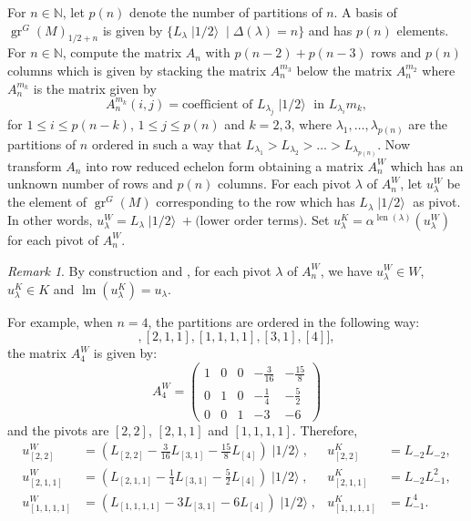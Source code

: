 \documentclass[a4paper, 12pt, reqno]{amsart}
\theoremstyle{remark}
\newtheorem{remark}[theorem]{Remark}
\numberwithin{equation}{subsection}
\DeclareMathOperator{\gr}{gr}
\DeclareMathOperator{\lm}{lm}
\DeclareMathOperator{\len}{len}
\DeclareMathOperator{\vachalf}{|1/2\rangle}
\begin{document}
For $n \in \mathbb{N}$, let $p(n)$ denote the number of partitions of $n$.
A basis of $\gr^G(M)_{1/2 + n}$ is given by $\{L_\lambda\vachalf \mid \Delta(\lambda) = n\}$ and has $p(n)$ elements. 
For $n \in \mathbb{N}$, compute the matrix $A_n$ with $p(n - 2) + p(n - 3)$ rows and $p(n)$ columns which is given by stacking the matrix $A^{m_3}_n$ below the matrix $A^{m_2}_n$ where $A^{m_k}_n$ is the matrix given by
\begin{equation*}
  A^{m_k}_n(i, j) = \text{coefficient of }L_{\lambda_j}\vachalf\text{ in }L_{\lambda_i}m_k,
\end{equation*}
for $1 \le i \le p(n - k)$, $1 \le j \le p(n)$ and $k = 2, 3$, where $\lambda_1, \dots, \lambda_{p(n)}$ are the partitions of $n$ ordered in such a way that $L_{\lambda_1} > L_{\lambda_2} > \dots > L_{\lambda_{p(n)}}$.
Now transform $A_n$ into row reduced echelon form obtaining a matrix $A^W_n$ which has an unknown number of rows and $p(n)$ columns.
For each pivot $\lambda$ of $A^W_n$, let $u^W_\lambda$ be the element of $\gr^G(M)$ corresponding to the row which has $L_\lambda\vachalf$ as pivot.
In other words, $u^W_\lambda = L_\lambda\vachalf + \text{(lower order terms)}$.
Set $u^K_\lambda = \alpha^{\len(\lambda)}(u^W_\lambda)$ for each pivot of $A^W_n$.

\begin{remark}
  \label{rmk:37}
  By construction and , for each pivot $\lambda$ of $A^W_n$, we have $u^W_\lambda \in W$, $u^K_\lambda \in K$ and $\lm(u^K_\lambda) = u_\lambda$.
\end{remark}

For example, when $n = 4$, the partitions are ordered in the following way:
  \begin{equation*}
    [[2, 2], [2, 1, 1], [1, 1, 1, 1], [3, 1], [4]],
  \end{equation*}
  the matrix $A^W_4$ is given by:
  \begin{equation*}
    A^W_4=
    \begin{pmatrix}
      1 & 0 & 0 & -\frac{3}{16} & -\frac{15}{8} \\
      0 & 1 & 0 & -\frac{1}{4} & -\frac{5}{2} \\
      0 & 0 & 1 & -3 & -6
    \end{pmatrix}
  \end{equation*}
  and the pivots are $[2, 2]$, $[2, 1, 1]$ and $[1, 1, 1, 1]$.
  Therefore,
  \begin{align*}
    u^W_{[2, 2]} &= (L_{[2, 2]} - \tfrac{3}{16}L_{[3, 1]} - \tfrac{15}{8}L_{[4]})\vachalf, &u^K_{[2, 2]} &= L_{-2}L_{-2}, \\
    u^W_{[2, 1, 1]} &= (L_{[2, 1, 1]} - \tfrac{1}{4}L_{[3, 1]} - \tfrac{5}{2}L_{[4]})\vachalf, &u^K_{[2, 1, 1]} &= L_{-2}L_{-1}^2, \\
    u^W_{[1, 1, 1, 1]} &= (L_{[1, 1, 1, 1]} - 3L_{[3, 1]} - 6L_{[4]})\vachalf, &u^K_{[1, 1, 1, 1]} &= L_{-1}^4.
  \end{align*}
  
\end{document}

